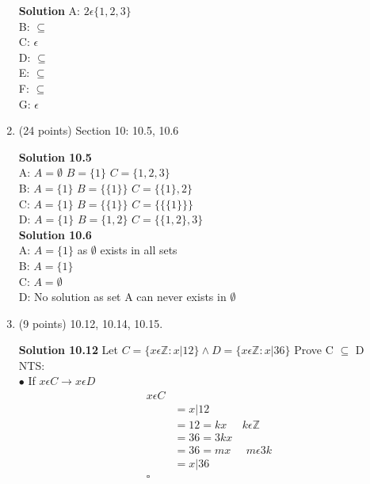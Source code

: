 \documentclass[12pt]{article}
\begin{document}
\begin{enumerate}
    \textbf{Solution} 
     \noindent A: $2 \epsilon \{1,2,3\}$ \\
     \noindent B: $\subseteq$ \\
     \noindent C: $\epsilon$ \\ 
     \noindent D: $\subseteq$ \\ 
     \noindent E: $\subseteq$ \\
     \noindent F: $\subseteq$ \\
     \noindent G: $\epsilon$ \\
    
    
    
    
    \item (24 points) Section 10: 10.5, 10.6
    
    \textbf{Solution 10.5} \\
    \noindent A: $A = \emptyset$ \;\; $B = \{1\}$ \;\; $C=\{1,2,3\}$ \\
    \noindent B: $A = \{1\}$ \;\; $B = \{\{1\}\}$ \;\; $C=\{\{1\},2\}$ \\
    \noindent C: $A = \{1\}$ \;\; $B = \{\{1\}\}$ \;\; $C=\{\{\{1\}\}\}$ \\
    \noindent D: $A = \{1\}$ \;\; $B = \{1, 2\}$ \;\; $C=\{\{1,2\},3\}$ \\
    
    
    \textbf{Solution 10.6} \\
    \noindent A: $A = \{1 \}$ as $\emptyset$ exists in all sets \\ 
    \noindent B: $A = \{1\}$ \\
    \noindent C: $A=\emptyset$ \\
    \noindent D: No solution as set A can never exists in $\emptyset$ \\
    

    
    \item (9 points) 10.12, 10.14, 10.15.  
    
    \textbf{Solution 10.12} Let $C=\{x \epsilon \mathbb{Z} : x| 12 \} \wedge  D= \{x \epsilon \mathbb{Z}: x|36 \}$ Prove C $\subseteq$ D \\
    NTS: \\
       $\bullet$ If $x \epsilon C \rightarrow x \epsilon D$ \\
       \[
\begin{aligned} 
 x \epsilon C \\
&=  x|12\;\; \\ 
&=  12 = kx \;\;\;\;\; k \epsilon \mathbb{Z}\\
&= 36 = 3kx\;\; \\
&= 36 = mx \;\;\;\;\; m \epsilon 3k\\
&= x|36 \\
\square \\
\end{aligned}
\]
 

\end{enumerate}
\end{document}
